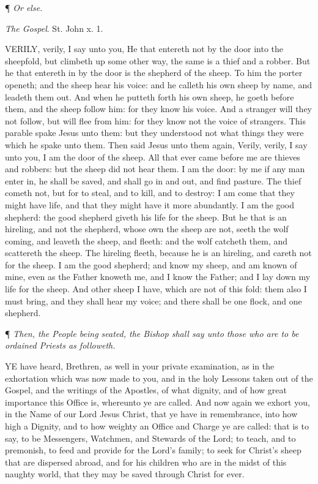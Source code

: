 ¶ \emph{Or else.}

\emph{The Gospel}. St. John x. 1.

VERILY, verily, I say unto
you, He that entereth not by the door into the sheepfold, but climbeth
up some other way, the same is a thief and a robber. But he that entereth
in by the door is the shepherd of the sheep. To him the porter openeth;
and the sheep hear his voice: and he calleth his own sheep by name, and
leadeth them out. And when he putteth forth his own sheep, he goeth before
them, and the sheep follow him: for they know his voice. And a stranger
will they not follow, but will flee from him: for they know not the voice
of strangers. This parable spake Jesus unto them: but they understood
not what things they were which he spake unto them. Then said Jesus unto
them again, Verily, verily, I say unto you, I am the door of the sheep.
All that ever came before me are thieves and robbers: but the sheep did
not hear them. I am the door: by me if any man enter in, he shall be saved,
and shall go in and out, and find pasture. The thief cometh not, but for
to steal, and to kill, and to destroy: I am come that they might have
life, and that they might have it more abundantly. I am the good shepherd:
the good shepherd giveth his life for the sheep. But he that is an hireling,
and not the shepherd, whose own the sheep are not, seeth the wolf coming,
and leaveth the sheep, and fleeth: and the wolf catcheth them, and scattereth
the sheep. The hireling fleeth, because he is an hireling, and careth
not for the sheep. I am the good shepherd; and know my sheep, and am known
of mine, even as the Father knoweth me, and I know the Father; and I lay
down my life for the sheep. And other sheep I have, which are not of this
fold: them also I must bring, and they shall hear my voice; and there
shall be one flock, and one shepherd. 

¶
\emph{Then, the People being seated, the Bishop shall say unto those who
are to be ordained Priests as followeth.}

YE
have heard, Brethren, as well in your private examination, as in the
exhortation which was now made to you, and in the holy Lessons taken
out of the Gospel, and the writings of the Apostles, of what dignity,
and of how great importance this Office is, whereunto ye are called.
And now again we exhort you, in the Name of our Lord Jesus Christ, that
ye have in remembrance, into how high a Dignity, and to how weighty
an Office and Charge ye are called: that is to say, to be Messengers,
Watchmen, and Stewards of the Lord; to teach, and to premonish, to feed
and provide for the Lord’s family; to seek for Christ’s
sheep that are dispersed abroad, and for his children who are in the
midst of this naughty world, that they may be saved through Christ for
ever.

